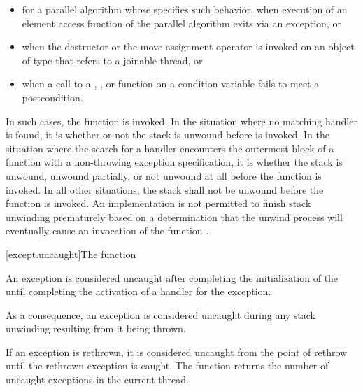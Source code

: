 \begin{note}
\begin{itemize}
\item%
for a parallel algorithm whose  specifies such
behavior,
when execution of an element access function
of the parallel algorithm exits via an exception, or

\item%
when the destructor or the move assignment operator is invoked on an object
of type  that refers to
a joinable thread, or

\item%
when a call to a , , or 
function on a condition variable
fails to meet a postcondition.

\end{itemize}

\end{note}

\pnum
{}%
In such cases,
the function  is invoked.
In the situation where no matching handler is found, it is
whether or not the stack is unwound
before  is invoked.
In the situation where the search for a handler encounters the
outermost block of a function
with a non-throwing exception specification, it is
whether the stack is unwound, unwound partially, or not unwound at all
before the function  is invoked.
In all other situations, the stack shall not be unwound before
the function 
is invoked.
An implementation is not permitted to finish stack unwinding
prematurely based on a determination that the unwind process
will eventually cause an invocation of the function
.

[except.uncaught]{The  function}%

\pnum
An exception is considered uncaught
after completing the initialization of the 
until completing the activation of a handler for the exception.
\begin{note}
As a consequence, an exception is considered uncaught
during any stack unwinding resulting from it being thrown.
\end{note}
If an exception is rethrown,
it is considered uncaught from the point of rethrow
until the rethrown exception is caught.
The function 
returns the number of uncaught exceptions in the current thread.%
